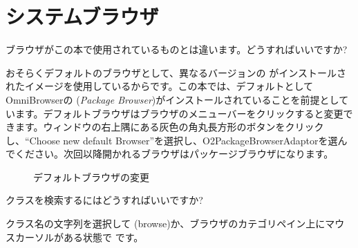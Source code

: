\documentclass[a4paper,10pt,twoside]{book}
\begin{document}
\section{システムブラウザ}


\begin{faq}
ブラウザがこの本で使用されているものとは違います。どうすればいいですか?
\end{faq}
\answer
おそらくデフォルトのブラウザとして、異なるバージョンの  がインストールされたイメージを使用しているからです。この本では、デフォルトとして OmniBrowserの (\emph{Package Browser})がインストールされていることを前提としています。デフォルトブラウザはブラウザのメニューバーをクリックすると変更できます。ウィンドウの右上隅にある灰色の角丸長方形のボタンをクリックし、“Choose new default Browser”を選択し、O2PackageBrowserAdaptorを選んでください。次回以降開かれるブラウザはパッケージブラウザになります。

\begin{figure}[tbh]
	\centering
	\hfill
	\hfill
	\caption{デフォルトブラウザの変更}
\end{figure}

\begin{faq}
クラスを検索するにはどうすればいいですか?
\end{faq}
\answer
クラス名の文字列を選択して  (browse)か、ブラウザのカテゴリペイン上にマウスカーソルがある状態で  です。
\end{document}
